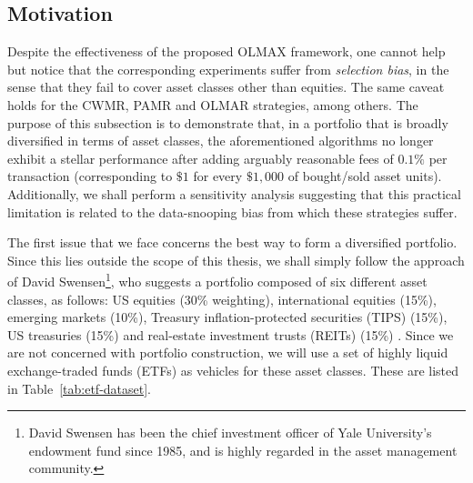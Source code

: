 \subsection{Motivation}

Despite the effectiveness of the proposed OLMAX framework, one cannot help but notice that the corresponding experiments suffer from \emph{selection bias}, in the sense that they fail to cover asset classes other than equities. The same caveat holds for the CWMR, PAMR and OLMAR strategies, among others. The purpose of this subsection is to demonstrate that, in a portfolio that is broadly diversified in terms of asset classes, the aforementioned algorithms no longer exhibit a stellar performance after adding arguably reasonable fees of $0.1\%$ per transaction (corresponding to $\$1$ for every $\$1,000$ of bought/sold asset units). Additionally, we shall perform a sensitivity analysis suggesting that this practical limitation is related to the data-snooping bias from which these strategies suffer.

The first issue that we face concerns the best way to form a diversified portfolio. Since this lies outside the scope of this thesis, we shall simply follow the approach of David Swensen\footnote{David Swensen has been the chief investment officer of Yale University's endowment fund since 1985, and is highly regarded in the asset management community.}, who suggests a portfolio composed of six different asset classes, as follows: US equities (30\% weighting), international equities (15\%), emerging markets (10\%), Treasury inflation-protected securities (TIPS) (15\%), US treasuries (15\%) and real-estate investment trusts (REITs) (15\%) \citep{swensen}. Since we are not concerned with portfolio construction, we will use a set of highly liquid exchange-traded funds (ETFs) as vehicles for these asset classes. These are listed in Table~\ref{tab:etf-dataset}.
\begin{table}[H]
  \caption{Exchange-traded fund (ETF) dataset used in our empirical evaluation. Daily adjusted closing prices for these ETFs were obtained from \href{https://finance.yahoo.com/}{Yahoo! Finance}, for the period from January 1, 2005 until June 3, 2019 inclusive.}
  \label{tab:etf-dataset}
  \centering
\end{table}

